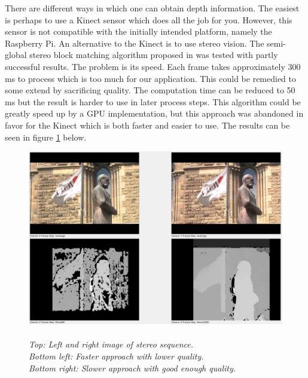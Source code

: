 
There are different ways in which one can obtain depth information. The easiest is perhaps to use a Kinect sensor which does all the job for you. However, this sensor is not compatible with the initially intended platform, namely the Raspberry Pi. An alternative to the Kinect is to use stereo vision. The semi-global stereo block matching algorithm proposed in \cite{StereoBM} was tested with partly successful results. The problem is its speed. Each frame takes approximately 300 ms to process which is too much for our application. This could be remedied to some extend by sacrificing quality. The computation time can be reduced to 50 ms but the result is harder to use in later process steps. This algorithm could be greatly speed up by a GPU implementation, but this approach was abandoned in favor for the Kinect which is both faster and easier to use. The results can be seen in figure \ref{fig:Stereo} below.

\vspace{1cm}
\begin{figure}[htb]
	\includegraphics[width=\linewidth]{images/stereoComp.png}
	\caption[An example of depth images calculated from a stereo sequence]{\\\textit{
	Top: Left and right image of stereo sequence.\\ 
	Bottom left: Faster approach with lower quality.\\ 
	Bottom right: Slower approach with good enough quality.}}
	\label{fig:Stereo}  %
\end{figure}
\newpage

